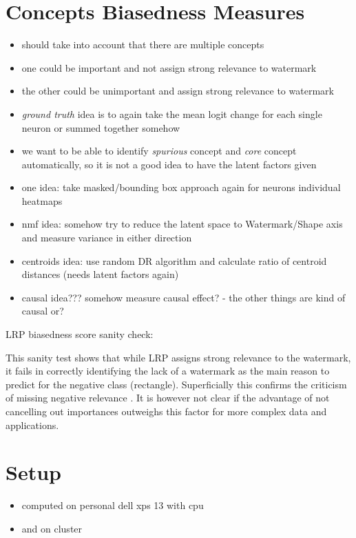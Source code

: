 \section{Concepts Biasedness Measures}
\begin{itemize}
    \item should take into account that there are multiple concepts
    \item one could be important and not assign strong relevance to watermark
    \item the other could be unimportant and assign strong relevance to watermark
    \item \textit{ground truth} idea is to again take the mean logit change for each single neuron or summed together somehow
    \item we want to be able to identify \textit{spurious} concept and \textit{core} concept automatically, so it is not a good idea to have the latent factors given
    \item one idea: take masked/bounding box approach again for neurons individual heatmaps
    \item nmf idea: somehow try to reduce the latent space to Watermark/Shape axis and measure variance in either direction
    \item centroids idea: use random DR algorithm and calculate ratio of centroid distances (needs latent factors again)
    \item causal idea??? somehow measure causal effect? - the other things are kind of causal or?
\end{itemize}


LRP biasedness score sanity check:

This sanity test shows that while LRP assigns strong relevance to the watermark, it fails in correctly identifying the lack of a watermark as the main reason to predict for the negative class (rectangle). Superficially this confirms the criticism of missing negative relevance \cite{Sixt2020}. It is however not clear if the advantage of not cancelling out importances outweighs this factor for more complex data and applications.  

\section{Setup}
\label{section:setup} 
\begin{itemize}
    \item computed on personal dell xps 13 with cpu
    \item and on cluster 
\end{itemize}